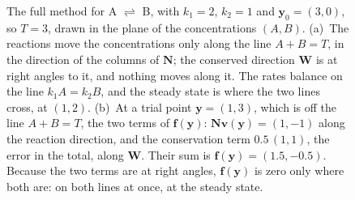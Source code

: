 \documentclass[11pt,a4paper,openany]{report}
\begin{document}
{{\begin{figure}[htbp]
\caption{The full method for A $\rightleftharpoons$ B, with $k_1 = 2$,
  $k_2 = 1$ and $\mathbf{y}_0 = (3, 0)$, so $T = 3$, drawn in the plane of the
  concentrations $(A, B)$. (a)~The reactions move the concentrations only
  along the line $A + B = T$, in the direction of the columns of
  $\mathbf{N}$; the conserved direction $\mathbf{W}$ is at right angles to
  it, and nothing moves along it. The rates balance on the line $k_1 A = k_2
  B$, and the steady state is where the two lines cross, at $(1, 2)$.
  (b)~At a trial point $\mathbf{y} = (1, 3)$, which is off the line $A + B =
  T$, the two terms of $\mathbf{f}(\mathbf{y})$: $\mathbf{N}\mathbf{v}(\mathbf{y})
  = (1, -1)$ along the reaction direction, and the conservation term $0.5\,(1,
  1)$, the error in the total, along $\mathbf{W}$. Their sum is
  $\mathbf{f}(\mathbf{y}) = (1.5, -0.5)$. Because the two terms are at right
  angles, $\mathbf{f}(\mathbf{y})$ is zero only where both are: on both lines at once,
  at the steady state.}
\label{fig:full-plane}
\end{figure}

}}
\end{document}
